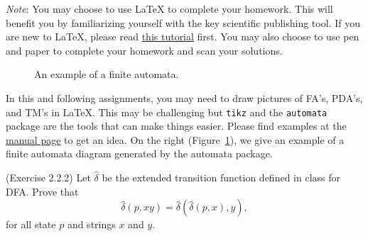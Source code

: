\documentclass[10pt]{homework}
\begin{document}
\textit{Note}: You may choose to use LaTeX to complete your homework.
This will benefit you by familiarizing yourself with the key scientific
publishing tool.
If you are new to LaTeX, please read
\href{https://ctan.org/tex-archive/info/lshort/}{this tutorial} first.
You may also choose to use pen and paper to complete your homework and scan
your solutions.

\begin{figure}
  \caption{An example of a finite automata.}\label{fig:fa-example}
\end{figure}

In this and following assignments, you may need to draw pictures of FA's, PDA's,
and TM's in LaTeX.
This may be challenging but \verb|tikz| and the \verb|automata| package are the
tools that can make things easier.
Please find examples at the \href{https://tikz.dev/library-automata}{manual
  page} to get an idea.
On the right (Figure~\ref{fig:fa-example}), we give an example of a finite
automata diagram generated by the automata package.

\vspace{2em}

\begin{problem} (Exercise 2.2.2)
  Let $\hat{\delta}$ be the extended transition function
  defined in class for DFA\@.
  Prove that
  \begin{equation*}
    \hat{\delta} (p, xy) = \hat{\delta} (\hat{\delta} (p, x), y),
  \end{equation*}
  for all state $p$ and strings $x$ and $y$.
\end{problem}

\begin{solution}

\end{solution}
\end{document}
